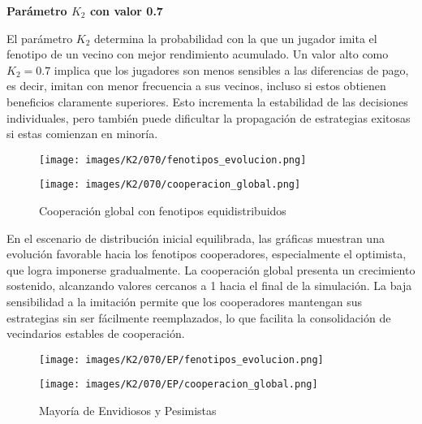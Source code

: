 \documentclass[a4paper,12pt]{report}
\begin{document}
\newpage

\vspace{1.5em}
\noindent\textbf{Parámetro \( K_2 \) con valor 0.7}
\vspace{0.5em}

El parámetro \( K_2 \) determina la probabilidad con la que un jugador imita el fenotipo de un vecino con mejor rendimiento acumulado. Un valor alto como \( K_2 = 0.7 \) implica que los jugadores son menos sensibles a las diferencias de pago, es decir, imitan con menor frecuencia a sus vecinos, incluso si estos obtienen beneficios claramente superiores. Esto incrementa la estabilidad de las decisiones individuales, pero también puede dificultar la propagación de estrategias exitosas si estas comienzan en minoría.

\begin{figure}[h!]
    \centering
    \begin{minipage}{0.49\textwidth}
    \centering
    \texttt{[image: images/K2/070/fenotipos\_evolucion.png]}
    \label{fig:enter-label}
    \end{minipage}
    \hfill
    \begin{minipage}{0.49\textwidth}
    \centering
    \texttt{[image: images/K2/070/cooperacion\_global.png]}
    \label{fig:enter-label}
    \end{minipage}
    \caption{Cooperación global con fenotipos equidistribuidos}
\end{figure}

En el escenario de distribución inicial equilibrada, las gráficas muestran una evolución favorable hacia los fenotipos cooperadores, especialmente el optimista, que logra imponerse gradualmente. La cooperación global presenta un crecimiento sostenido, alcanzando valores cercanos a 1 hacia el final de la simulación. La baja sensibilidad a la imitación permite que los cooperadores mantengan sus estrategias sin ser fácilmente reemplazados, lo que facilita la consolidación de vecindarios estables de cooperación.

\begin{figure}[h]
    \centering
    \begin{minipage}{0.49\textwidth}
    \centering
    \texttt{[image: images/K2/070/EP/fenotipos\_evolucion.png]}
    \label{fig:enter-label}
    \end{minipage}
    \hfill
    \begin{minipage}{0.49\textwidth}
    \centering
    \texttt{[image: images/K2/070/EP/cooperacion\_global.png]}
    \label{fig:enter-label}
    \end{minipage}
    \caption{Mayoría de Envidiosos y Pesimistas}
\end{figure}
\end{document}
